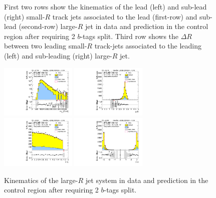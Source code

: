 \begin{figure}[htbp!]
\begin{center}
  \caption{First two rows show the kinematics of the lead (left) and sub-lead (right) small-$R$ track jets associated to the lead (first-row) and sub-lead (second-row) large-$R$ jet in data and prediction in the control region after requiring 2 $b$-tags split. Third row shows the $\Delta R$ between two leading small-$R$ track-jets associated to the leading (left) and sub-leading (right) large-$R$ jet.  }
  \label{fig:boosted-2bs-control-ak2}
\end{center}
\end{figure}


\begin{figure}[htbp!]
\begin{center}
\includegraphics[width=0.32\textwidth,angle=-90]{figures/boosted/Control/b77_TwoTag_split_Control_mHH_l_1.pdf}
\includegraphics[width=0.32\textwidth,angle=-90]{figures/boosted/Control/b77_TwoTag_split_Control_hCandDr.pdf}\\
\includegraphics[width=0.32\textwidth,angle=-90]{figures/boosted/Control/b77_TwoTag_split_Control_hCandDeta.pdf}
\includegraphics[width=0.32\textwidth,angle=-90]{figures/boosted/Control/b77_TwoTag_split_Control_hCandDphi.pdf}
  \caption{Kinematics of the large-$R$ jet system in data and prediction in the control region after requiring 2 $b$-tags split.  }
  \label{fig:boosted-2bs-control-ak10-system}
\end{center}
\end{figure}


